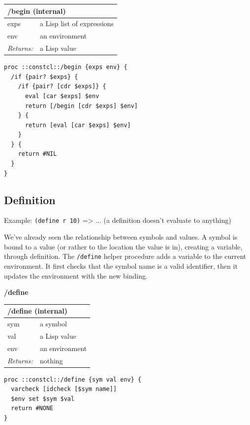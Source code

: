 \documentclass[twoside,9pt]{report}
\begin{document}
\begin{tabular}{ |l l| }
\hline
\multicolumn{2}{|l|}{/begin (internal)} \\
\hline
exps & a Lisp list of expressions \\
env & an environment \\
\textit{Returns:} & a Lisp value \\
\hline
\end{tabular}

\noindent\makebox[\linewidth]{\rule{\linewidth}{0.4pt}}
\begin{lstlisting}
proc ::constcl::/begin {exps env} {
  /if {pair? $exps} {
    /if {pair? [cdr $exps]} {
      eval [car $exps] $env
      return [/begin [cdr $exps] $env]
    } {
      return [eval [car $exps] $env]
    }
  } {
    return #NIL
  }
}
\end{lstlisting}
\noindent\makebox[\linewidth]{\rule{\linewidth}{0.4pt}}
\subsection{Definition}
\label{definition}

Example: \texttt{(define r 10)} => ... (a definition doesn't evaluate to anything)


We've already seen the relationship between symbols and values. A symbol is bound to a value (or rather to the location the value is in), creating a variable, through definition. The \texttt{/define} helper procedure adds a variable to the current environment. It first checks that the symbol name is a valid identifier, then it updates the environment with the new binding.


\textbf{/define}

\begin{tabular}{ |l l| }
\hline
\multicolumn{2}{|l|}{/define (internal)} \\
\hline
sym & a symbol \\
val & a Lisp value \\
env & an environment \\
\textit{Returns:} & nothing \\
\hline
\end{tabular}

\noindent\makebox[\linewidth]{\rule{\linewidth}{0.4pt}}
\begin{lstlisting}
proc ::constcl::/define {sym val env} {
  varcheck [idcheck [$sym name]]
  $env set $sym $val
  return #NONE
}
\end{lstlisting}
\noindent\makebox[\linewidth]{\rule{\linewidth}{0.4pt}}
\end{document}
